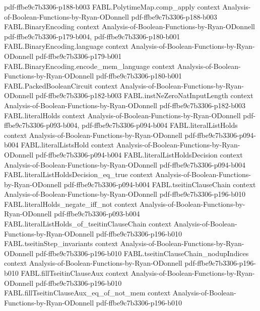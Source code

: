 \begin{theorem}
  {pdf-ffbe9c7b3306-p188-b003}
\proofstep
  {FABL.PolytimeMap.comp_apply}
  {context}
  {Analysis-of-Boolean-Functions-by-Ryan-ODonnell}
  {pdf-ffbe9c7b3306-p188-b003}
\proofstep
  {FABL.BinaryEncoding}
  {context}
  {Analysis-of-Boolean-Functions-by-Ryan-ODonnell}
  {pdf-ffbe9c7b3306-p179-b004,
    pdf-ffbe9c7b3306-p180-b001}
\proofstep
  {FABL.BinaryEncoding.language}
  {context}
  {Analysis-of-Boolean-Functions-by-Ryan-ODonnell}
  {pdf-ffbe9c7b3306-p179-b001}
\proofstep
  {FABL.BinaryEncoding.encode_mem_language}
  {context}
  {Analysis-of-Boolean-Functions-by-Ryan-ODonnell}
  {pdf-ffbe9c7b3306-p180-b001}
\proofstep
  {FABL.PackedBooleanCircuit}
  {context}
  {Analysis-of-Boolean-Functions-by-Ryan-ODonnell}
  {pdf-ffbe9c7b3306-p182-b003}
\proofstep
  {FABL.instNeZeroNatInputLength}
  {context}
  {Analysis-of-Boolean-Functions-by-Ryan-ODonnell}
  {pdf-ffbe9c7b3306-p182-b003}
\proofstep
  {FABL.literalHolds}
  {context}
  {Analysis-of-Boolean-Functions-by-Ryan-ODonnell}
  {pdf-ffbe9c7b3306-p093-b004,
    pdf-ffbe9c7b3306-p094-b004}
\proofstep
  {FABL.literalListHolds}
  {context}
  {Analysis-of-Boolean-Functions-by-Ryan-ODonnell}
  {pdf-ffbe9c7b3306-p094-b004}
\proofstep
  {FABL.literalListsHold}
  {context}
  {Analysis-of-Boolean-Functions-by-Ryan-ODonnell}
  {pdf-ffbe9c7b3306-p094-b004}
\proofstep
  {FABL.literalListHoldsDecision}
  {context}
  {Analysis-of-Boolean-Functions-by-Ryan-ODonnell}
  {pdf-ffbe9c7b3306-p094-b004}
\proofstep
  {FABL.literalListHoldsDecision_eq_true}
  {context}
  {Analysis-of-Boolean-Functions-by-Ryan-ODonnell}
  {pdf-ffbe9c7b3306-p094-b004}
\proofstep
  {FABL.tseitinClauseChain}
  {context}
  {Analysis-of-Boolean-Functions-by-Ryan-ODonnell}
  {pdf-ffbe9c7b3306-p196-b010}
\proofstep
  {FABL.literalHolds_negate_iff_not}
  {context}
  {Analysis-of-Boolean-Functions-by-Ryan-ODonnell}
  {pdf-ffbe9c7b3306-p093-b004}
\proofstep
  {FABL.literalListHolds_of_tseitinClauseChain}
  {context}
  {Analysis-of-Boolean-Functions-by-Ryan-ODonnell}
  {pdf-ffbe9c7b3306-p196-b010}
\proofstep
  {FABL.tseitinStep_invariants}
  {context}
  {Analysis-of-Boolean-Functions-by-Ryan-ODonnell}
  {pdf-ffbe9c7b3306-p196-b010}
\proofstep
  {FABL.tseitinClauseChain_nodupIndices}
  {context}
  {Analysis-of-Boolean-Functions-by-Ryan-ODonnell}
  {pdf-ffbe9c7b3306-p196-b010}
\proofstep
  {FABL.fillTseitinClauseAux}
  {context}
  {Analysis-of-Boolean-Functions-by-Ryan-ODonnell}
  {pdf-ffbe9c7b3306-p196-b010}
\proofstep
  {FABL.fillTseitinClauseAux_eq_of_not_mem}
  {context}
  {Analysis-of-Boolean-Functions-by-Ryan-ODonnell}
  {pdf-ffbe9c7b3306-p196-b010}
\proofstep

\end{theorem}
